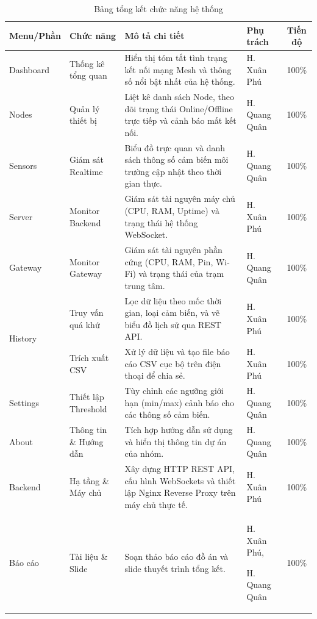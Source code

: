 \documentclass{article}
\begin{document}
\begin{table}[H]
    \centering
    \renewcommand{\arraystretch}{1.3}
    \begin{tabularx}{\textwidth}{|l|>{\raggedright\arraybackslash}p{2.5cm}|X|>{\raggedright\arraybackslash}p{2.2cm}|c|}
        \hline
        \textbf{Menu/Phần} & \textbf{Chức năng} & \textbf{Mô tả chi tiết} & \textbf{Phụ trách} & \textbf{Tiến độ} \\
        \hline
        Dashboard & Thống kê tổng quan & Hiển thị tóm tắt tình trạng kết nối mạng Mesh và thông số nổi bật nhất của hệ thống. & H. Xuân Phú & 100\% \\
        \hline
        Nodes & Quản lý thiết bị & Liệt kê danh sách Node, theo dõi trạng thái Online/Offline trực tiếp và cảnh báo mất kết nối. & H. Quang Quân & 100\% \\
        \hline
        Sensors & Giám sát Realtime & Biểu đồ trực quan và danh sách thông số cảm biến môi trường cập nhật theo thời gian thực. & H. Quang Quân & 100\% \\
        \hline
        Server & Monitor Backend & Giám sát tài nguyên máy chủ (CPU, RAM, Uptime) và trạng thái hệ thống WebSocket. & H. Xuân Phú & 100\% \\
        \hline
        Gateway & Monitor Gateway & Giám sát tài nguyên phần cứng (CPU, RAM, Pin, Wi-Fi) và trạng thái của trạm trung tâm. & H. Quang Quân & 100\% \\
        \hline
        \multirow{2}{*}{History} & Truy vấn quá khứ & Lọc dữ liệu theo mốc thời gian, loại cảm biến, và vẽ biểu đồ lịch sử qua REST API. & H. Xuân Phú & 100\% \\ \cline{2-5}
        & Trích xuất CSV & Xử lý dữ liệu và tạo file báo cáo CSV cục bộ trên điện thoại để chia sẻ. & H. Xuân Phú & 100\% \\
        \hline
        Settings & Thiết lập Threshold & Tùy chỉnh các ngưỡng giới hạn (min/max) cảnh báo cho các thông số cảm biến. & H. Quang Quân & 100\% \\
        \hline
        About & Thông tin \& Hướng dẫn & Tích hợp hướng dẫn sử dụng và hiển thị thông tin dự án của nhóm. & H. Quang Quân & 100\% \\
        \hline
        Backend & Hạ tầng \& Máy chủ & Xây dựng HTTP REST API, cấu hình WebSockets và thiết lập Nginx Reverse Proxy trên máy chủ thực tế. & H. Xuân Phú & 100\% \\
        \hline
        Báo cáo & Tài liệu \& Slide & Soạn thảo báo cáo đồ án và slide thuyết trình tổng kết. & H. Xuân Phú, \par H. Quang Quân & 100\% \\
        \hline
    \end{tabularx}
    \caption{Bảng tổng kết chức năng hệ thống}
\end{table}
\end{document}
